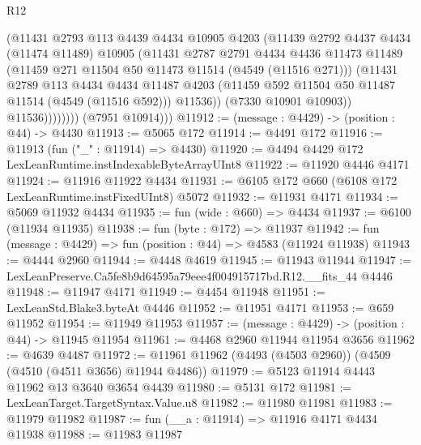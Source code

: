 \begin{lexlean}{R12}
\begin{coremodule}
                      (@11431
                        @2793
                        @113
                        @4439
                        @4434
                        @10905
                        @4203
                        (@11439
                          @2792
                          @4437
                          @4434
                          (@11474 @11489)
                          @10905
                          (@11431
                            @2787
                            @2791
                            @4434
                            @4436
                            @11473
                            @11489
                            (@11459 @271 @11504 @50 @11473 @11514 (@4549 (@11516 @271)))
                            (@11431
                              @2789
                              @113
                              @4434
                              @4434
                              @11487
                              @4203
                              (@11459 @592 @11504 @50 @11487 @11514 (@4549 (@11516 @592)))
                              @11536))
                          (@7330 @10901 @10903))
                        @11536))))))))
        (@7951 @10914)))
@11912 := (message : @4429) -> (position : @44) -> @4430
@11913 := @5065 @172
@11914 := @4491 @172
@11916 := @11913 (fun ("_" : @11914) => @4430)
@11920 := @4494 @4429 @172 LexLeanRuntime.instIndexableByteArrayUInt8
@11922 := @11920 @4446 @4171
@11924 := @11916 @11922 @4434
@11931 := @6105 @172 @660 (@6108 @172 LexLeanRuntime.instFixedUInt8) @5072
@11932 := @11931 @4171
@11934 := @5069 @11932 @4434
@11935 := fun (wide : @660) => @4434
@11937 := @6100 (@11934 @11935)
@11938 := fun (byte : @172) => @11937
@11942 := fun (message : @4429) => fun (position : @44) => @4583 (@11924 @11938)
@11943 := @4444 @2960
@11944 := @4448 @4619
@11945 := @11943 @11944
@11947 := LexLeanPreserve.Ca5fe8b9d64595a79eee4f004915717bd.R12.__fits_44 @4446
@11948 := @11947 @4171
@11949 := @4454 @11948
@11951 := LexLeanStd.Blake3.byteAt @4446
@11952 := @11951 @4171
@11953 := @659 @11952
@11954 := @11949 @11953
@11957 := (message : @4429) -> (position : @44) -> @11945 @11954
@11961 := @4468 @2960 @11944 @11954 @3656
@11962 := @4639 @4487
@11972 := @11961 @11962 (@4493 (@4503 @2960)) (@4509 (@4510 (@4511 @3656) @11944 @4486))
@11979 := @5123 @11914 @4443 @11962 @13 @3640 @3654 @4439
@11980 := @5131 @172
@11981 := LexLeanTarget.TargetSyntax.Value.u8
@11982 := @11980 @11981
@11983 := @11979 @11982
@11987 := fun (__a : @11914) => @11916 @4171 @4434 @11938
@11988 := @11983 @11987

\end{coremodule}
\end{lexlean}
